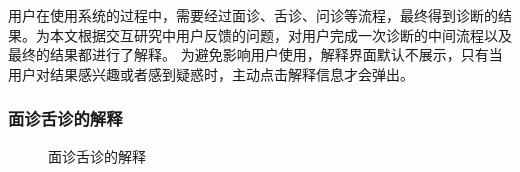 用户在使用系统的过程中，需要经过面诊、舌诊、问诊等流程，最终得到诊断的结果。为本文根据交互研究中用户反馈的问题，对用户完成一次诊断的中间流程以及最终的结果都进行了解释。
为避免影响用户使用，解释界面默认不展示，只有当用户对结果感兴趣或者感到疑惑时，主动点击解释信息才会弹出。

\subsubsection{面诊舌诊的解释}

\begin{figure}[htbp]   
    \centering
    \caption{面诊舌诊的解释}
    \label{fig:face_diags}
\end{figure}

